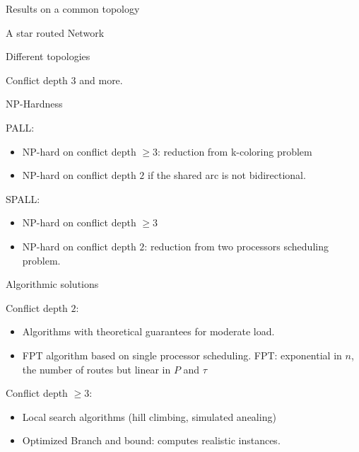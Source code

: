 \documentclass[10 pt]{beamer}
\begin{document}
\begin{section}{Results on a common topology}
\begin{subsection}{A star routed Network}
\begin{frame}{Different topologies}
\begin{multicols}{2}
 Conflict depth $3$ and more.

\end{multicols}
\end{frame} 

\begin{frame}{NP-Hardness}


   \begin{multicols}{2}
   PALL:
   \begin{itemize}
   \item NP-hard on conflict depth $\geq 3$: reduction from k-coloring problem
   \item NP-hard on conflict depth $2$ if the shared arc is not bidirectional.
   \end{itemize}
   
   SPALL:
   \begin{itemize}
    \item NP-hard on conflict depth $\geq 3$ 
       \item NP-hard on conflict depth $2$: reduction from two processors scheduling problem.
   \end{itemize}
   \end{multicols}

\end{frame}


\begin{frame}{Algorithmic solutions}


   \begin{multicols}{2}
   Conflict depth $2$:
   \begin{itemize}
   \item Algorithms with theoretical guarantees for moderate load.
   \item FPT algorithm based on single processor scheduling. FPT: exponential in $n$, the number of routes but linear in $P$ and $\tau$
   \end{itemize}
   \vspace{1cm}
   Conflict depth $\geq 3$:
   \begin{itemize}
    \item Local search algorithms (hill climbing, simulated anealing) 
       \item Optimized Branch and bound: computes realistic instances.
   \end{itemize}
   \end{multicols}

\end{frame}
\end{subsection}



\end{section}
\end{document}

